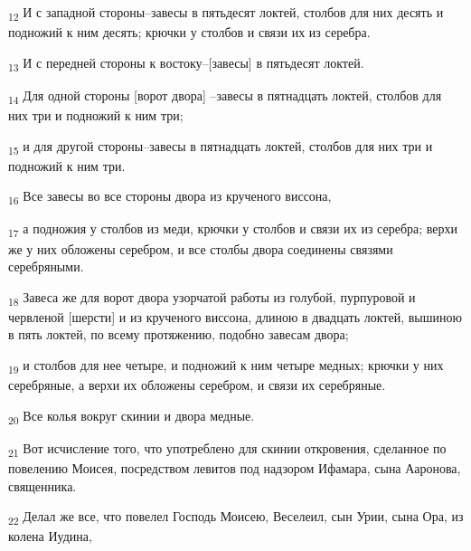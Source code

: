 \begin{tcolorbox}
\textsubscript{12} И с западной стороны--завесы в пятьдесят локтей, столбов для них десять и подножий к ним десять; крючки у столбов и связи их из серебра.
\end{tcolorbox}
\begin{tcolorbox}
\textsubscript{13} И с передней стороны к востоку--[завесы] в пятьдесят локтей.
\end{tcolorbox}
\begin{tcolorbox}
\textsubscript{14} Для одной стороны [ворот двора] --завесы в пятнадцать локтей, столбов для них три и подножий к ним три;
\end{tcolorbox}
\begin{tcolorbox}
\textsubscript{15} и для другой стороны--завесы в пятнадцать локтей, столбов для них три и подножий к ним три.
\end{tcolorbox}
\begin{tcolorbox}
\textsubscript{16} Все завесы во все стороны двора из крученого виссона,
\end{tcolorbox}
\begin{tcolorbox}
\textsubscript{17} а подножия у столбов из меди, крючки у столбов и связи их из серебра; верхи же у них обложены серебром, и все столбы двора соединены связями серебряными.
\end{tcolorbox}
\begin{tcolorbox}
\textsubscript{18} Завеса же для ворот двора узорчатой работы из голубой, пурпуровой и червленой [шерсти] и из крученого виссона, длиною в двадцать локтей, вышиною в пять локтей, по всему протяжению, подобно завесам двора;
\end{tcolorbox}
\begin{tcolorbox}
\textsubscript{19} и столбов для нее четыре, и подножий к ним четыре медных; крючки у них серебряные, а верхи их обложены серебром, и связи их серебряные.
\end{tcolorbox}
\begin{tcolorbox}
\textsubscript{20} Все колья вокруг скинии и двора медные.
\end{tcolorbox}
\begin{tcolorbox}
\textsubscript{21} Вот исчисление того, что употреблено для скинии откровения, сделанное по повелению Моисея, посредством левитов под надзором Ифамара, сына Ааронова, священника.
\end{tcolorbox}
\begin{tcolorbox}
\textsubscript{22} Делал же все, что повелел Господь Моисею, Веселеил, сын Урии, сына Ора, из колена Иудина,
\end{tcolorbox}
